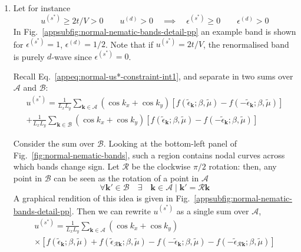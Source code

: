 \begin{enumerate}
	\item Let for instance
	\[
	u^{(s^*)} \ge 2t/V > 0
	\qquad
	u^{(d)} > 0
	\quad\implies\quad
	\epsilon^{(s^*)} \ge 0
	\qquad
	\epsilon^{(d)} > 0
	\]
	In Fig.~\ref{appsubfig:normal-nematic-bands-detail-pp} an example band is shown for $\epsilon^{(s^*)}=1$, $\epsilon^{(d)}=1/2$. Note that if $u^{(s^*)}=2t/V$, the renormalised band is purely $d$-wave since $\epsilon^{(s^*)}=0$. 
	
	Recall Eq.~\eqref{appeq:normal-us*-constraint-int1}, and separate in two sums over $\mathcal{A}$ and $\mathcal{B}$:
	\begin{multline*}
		u^{(s^*)} = \frac{1}{L_x L_y} \sum_{\mathbf{k}\in\mathcal{A}} (\cos k_x + \cos k_y) \left[
		f(\tilde{\epsilon}_\mathbf{k};\beta,\tilde{\mu}) - f(-\tilde{\epsilon}_\mathbf{k};\beta,\tilde{\mu})
		\right] \\
		+ \frac{1}{L_x L_y} \sum_{\mathbf{k}\in\mathcal{B}} (\cos k_x + \cos k_y) \left[
		f(\tilde{\epsilon}_\mathbf{k};\beta,\tilde{\mu}) - f(-\tilde{\epsilon}_\mathbf{k};\beta,\tilde{\mu})
		\right]
	\end{multline*}
	
	Consider the sum over $\mathcal{B}$. Looking at the bottom-left panel of Fig.~\ref{fig:normal-nematic-bands}, such a region contains nodal curves across which bands change sign.	
	Let $\mathcal{R}$ be the clockwise $\pi/2$ rotation: then, any point in $\mathcal{B}$ can be seen as the rotation of a point in $\mathcal{A}$
	\begin{equation}\label{appeq:normal-B=RA}
		\forall \mathbf{k}' \in \mathcal{B} 
		\quad\exists\quad \mathbf{k} \in \mathcal{A} \mid \mathbf{k}' = \mathcal{R} \mathbf{k}
	\end{equation}
	A graphical rendition of this idea is given in Fig.~\ref{appsubfig:normal-nematic-bands-detail-pp}. Then we can rewrite $u^{(s^*)}$ as a single sum over $\mathcal{A}$,
	\begin{multline}
		u^{(s^*)} = \frac{1}{L_x L_y} \sum_{\mathbf{k}\in\mathcal{A}} (\cos k_x + \cos k_y) \\
		\times \left[
		f(\tilde{\epsilon}_\mathbf{k};\beta,\tilde{\mu}) + f(\tilde{\epsilon}_{\mathcal{R}\mathbf{k}};\beta,\tilde{\mu}) - f(-\tilde{\epsilon}_\mathbf{k};\beta,\tilde{\mu}) - f(-\tilde{\epsilon}_{\mathcal{R}\mathbf{k}};\beta,\tilde{\mu})
		\right]
		\label{appeq:normal-us*-AR}
	\end{multline}
	

\end{enumerate}
